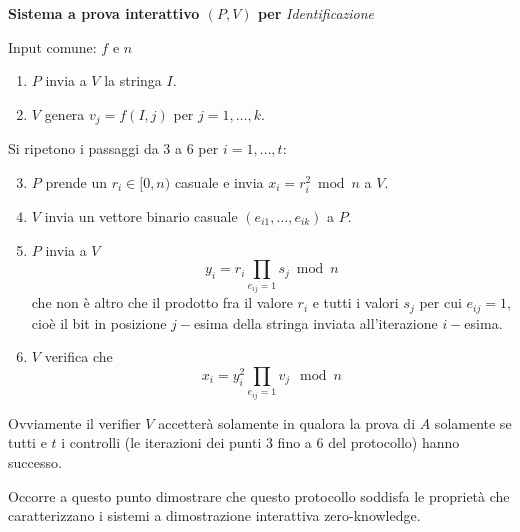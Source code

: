\documentclass{article}
\theoremstyle{definition}
\begin{document}
\begin{mdframed}
\begin{center}
    \vspace{10pt}
    \textbf{Sistema a prova interattivo $(P, V)$ per} \textit{Identificazione}
    \vspace{10pt}
\end{center} 
Input comune: $f$ e $n$
\begin{enumerate}
    \item $P$ invia a $V$ la stringa $I$. 
    \item $V$ genera $v_j = f(I, j)$ per $j = 1, \dots, k$.  
\end{enumerate}
Si ripetono i passaggi da 3 a 6 per $i = 1, \dots, t$:
\begin{enumerate}
    \setcounter{enumi}{2}
    \item $P$ prende un $r_i \in [0, n)$ casuale e invia $x_i = r_i^2 \bmod n$ a $V$.
    \item $V$ invia un vettore binario casuale $(e_{i1}, \dots, e_{ik})$ a $P$.
    \item $P$ invia a $V$ 
    \begin{equation}\label{eq:fiat_shamir_yi}
        y_i = r_i \prod_{e_{ij}=1} s_j \bmod n
    \end{equation}
    che non è altro che il prodotto fra il valore $r_i$ e tutti i valori $s_j$ per cui $e_{ij} = 1$, cioè il bit in posizione $j-$esima della stringa inviata all'iterazione $i-$esima.
    \item $V$ verifica che 
    \begin{equation}\label{eq:fiat_shamir_verifica}
        x_i = y_i^2 \prod_{e_{ij} = 1} v_j \mod n
    \end{equation}
\end{enumerate}
\end{mdframed}

Ovviamente il verifier $V$ accetterà solamente in qualora la prova di $A$ solamente se tutti e $t$ i controlli (le iterazioni dei punti 3 fino a 6 del protocollo) hanno successo.

Occorre a questo punto dimostrare che questo protocollo soddisfa le proprietà che caratterizzano i sistemi a dimostrazione interattiva zero-knowledge.
\end{document}
